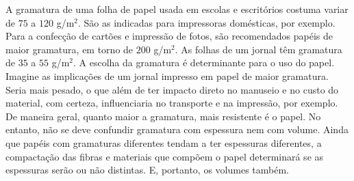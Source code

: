 \begin{knowledge}

A gramatura de uma folha de papel usada em escolas e escritórios costuma variar de $75$ a \(120\) g/m$^2$.  São as indicadas para impressoras domésticas, por exemplo. Para a confecção de cartões e impressão de fotos, são recomendados papéis de maior gramatura, em torno de \(200\) g/m$^2$.  As folhas de um jornal têm gramatura de $35$ a \(55\) g/m$^2$.  A escolha da gramatura é determinante para o uso do papel. Imagine as implicações de um jornal impresso em papel de maior gramatura. Seria mais pesado, o que além de ter impacto direto no manuseio e no custo do material, com certeza, influenciaria no transporte e na impressão, por exemplo. De maneira geral, quanto maior a gramatura, mais resistente é o papel. No entanto, não se deve confundir gramatura com espessura nem com volume. Ainda que papéis com gramaturas diferentes tendam a ter espessuras diferentes, a compactação das fibras e materiais que compõem o papel determinará se as espessuras serão ou não distintas. E, portanto, os volumes também.
\end{knowledge}

